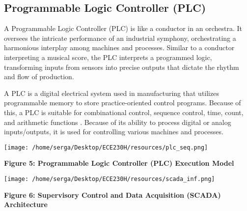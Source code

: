 \documentclass[12pt]{article}
\begin{document}
        \subsection{Programmable Logic Controller (PLC)}

        A Programmable Logic Controller (PLC) is like a conductor in an orchestra.
        It oversees the intricate performance of an industrial symphony, orchestrating
        a harmonious interplay among machines and processes. Similar to a conductor 
        interpreting a musical score, the PLC interprets a programmed logic,
        transforming inputs from sensors into precise outputs that dictate the rhythm
        and flow of production.

        A PLC is a digital electrical system used in manufacturing that 
        utilizes programmable memory to store practice-oriented control programs. 
        Because of this, a PLC is suitable for combinational control, sequence 
        control, time, count, and arithmetic functions \autocite[1]{Frey2014}. 
        Because of its ability to process digital or analog inputs/outputs, it 
        is used for controlling various machines and processes. 

        \begin{center}
            \vspace{0.5cm}

            \texttt{[image: /home/serga/Desktop/ECE230H/resources/plc\_seq.png]}
            
            \vspace{0.5cm}

            \textbf{Figure 5: Programmable Logic Controller (PLC) Execution Model} \autocite[2]{Frey2014}
            \label{plc_seq}
        
        \end{center}

        \begin{center}
            \vspace{0.5cm}

            \texttt{[image: /home/serga/Desktop/ECE230H/resources/scada\_inf.png]}
            
            \vspace{0.5cm}

            \textbf{Figure 6: Supervisory Control and Data Acquisition (SCADA) Architecture} \autocite[4]{pr11030918}
            \label{scada_inf}
        
        \end{center}
\end{document}
